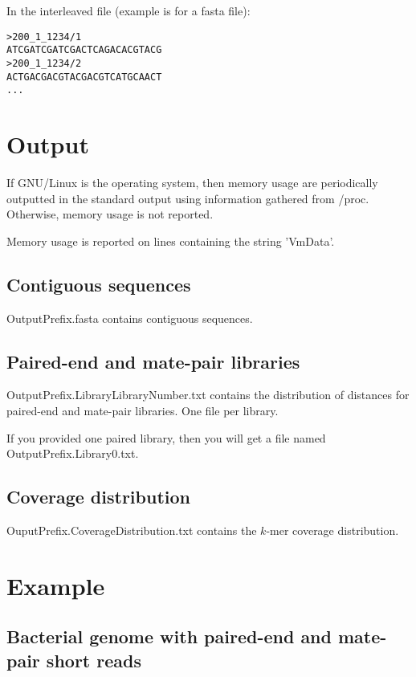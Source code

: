 \documentclass{article}
\begin{document}
In the interleaved file (example is for a fasta file):

\begin{verbatim}
>200_1_1234/1
ATCGATCGATCGACTCAGACACGTACG
>200_1_1234/2
ACTGACGACGTACGACGTCATGCAACT
...
\end{verbatim}



\section{Output}

If GNU/Linux is the operating system, then memory usage are periodically outputted in the 
standard output using information gathered from /proc. Otherwise, memory usage is not reported.

Memory usage is reported on lines containing the string 'VmData'.

\subsection{Contiguous sequences}

OutputPrefix.fasta contains contiguous sequences.

\subsection{Paired-end and mate-pair libraries}

OutputPrefix.LibraryLibraryNumber.txt contains the distribution of distances for paired-end and mate-pair libraries. One file per library.

If you provided one paired library, then you will get a file named OutputPrefix.Library0.txt.

\subsection{Coverage distribution}

OuputPrefix.CoverageDistribution.txt contains the $k$-mer coverage distribution.

\section{Example}

\subsection{Bacterial genome with paired-end and mate-pair short reads}
\end{document}
